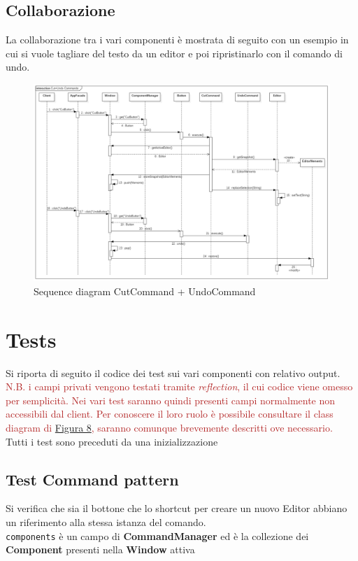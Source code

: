 \documentclass[12pt]{article}
\begin{document}
\subsection{Collaborazione}
La collaborazione tra i vari componenti è mostrata di seguito con un esempio in cui si vuole tagliare del testo da un editor e poi ripristinarlo con il comando di undo.
\begin{figure}[h!]
\centering
\includegraphics[width=\textwidth]{sequenceDiagram.png}
\caption{Sequence diagram CutCommand + UndoCommand}
\label{fig:lifecycleCutUndo}
\end{figure}

\newpage
\section{Tests}
Si riporta di seguito il codice dei test sui vari componenti con relativo output.\\
\textcolor{firebrick}{N.B. i campi privati vengono testati tramite \emph{reflection}, il cui codice viene omesso per semplicità. Nei vari test saranno quindi presenti campi normalmente non accessibili dal client. Per conoscere il loro ruolo è possibile consultare il class diagram di \hyperref[fig:project]{\color{firebrick}Figura 8}, saranno comunque brevemente descritti ove necessario.}\\
Tutti i test sono preceduti da una inizializzazione \\
\begin{minipage}{\textwidth}

\end{minipage}

\subsection{Test Command pattern}
Si verifica che sia il bottone che lo shortcut per creare un nuovo Editor abbiano un riferimento alla stessa istanza del comando.\\
\texttt{components} è un campo di \textbf{CommandManager} ed è la collezione dei \textbf{Component} presenti nella \textbf{Window} attiva \\
\begin{minipage}{\textwidth}

\end{minipage}
\end{document}
